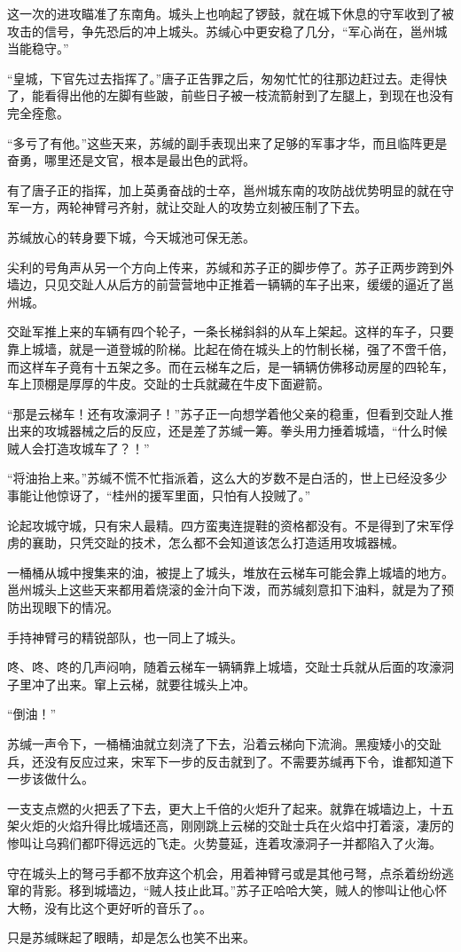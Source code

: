 这一次的进攻瞄准了东南角。城头上也响起了锣鼓，就在城下休息的守军收到了被攻击的信号，争先恐后的冲上城头。苏缄心中更安稳了几分，“军心尚在，邕州城当能稳守。”

“皇城，下官先过去指挥了。”唐子正告罪之后，匆匆忙忙的往那边赶过去。走得快了，能看得出他的左脚有些跛，前些日子被一枝流箭射到了左腿上，到现在也没有完全痊愈。

“多亏了有他。”这些天来，苏缄的副手表现出来了足够的军事才华，而且临阵更是奋勇，哪里还是文官，根本是最出色的武将。

有了唐子正的指挥，加上英勇奋战的士卒，邕州城东南的攻防战优势明显的就在守军一方，两轮神臂弓齐射，就让交趾人的攻势立刻被压制了下去。

苏缄放心的转身要下城，今天城池可保无恙。

尖利的号角声从另一个方向上传来，苏缄和苏子正的脚步停了。苏子正两步跨到外墙边，只见交趾人从后方的前营营地中正推着一辆辆的车子出来，缓缓的逼近了邕州城。

交趾军推上来的车辆有四个轮子，一条长梯斜斜的从车上架起。这样的车子，只要靠上城墙，就是一道登城的阶梯。比起在倚在城头上的竹制长梯，强了不啻千倍，而这样车子竟有十五架之多。而在云梯车之后，是一辆辆仿佛移动房屋的四轮车，车上顶棚是厚厚的牛皮。交趾的士兵就藏在牛皮下面避箭。

“那是云梯车！还有攻濠洞子！”苏子正一向想学着他父亲的稳重，但看到交趾人推出来的攻城器械之后的反应，还是差了苏缄一筹。拳头用力捶着城墙，“什么时候贼人会打造攻城车了？！”

“将油抬上来。”苏缄不慌不忙指派着，这么大的岁数不是白活的，世上已经没多少事能让他惊讶了，“桂州的援军里面，只怕有人投贼了。”

论起攻城守城，只有宋人最精。四方蛮夷连提鞋的资格都没有。不是得到了宋军俘虏的襄助，只凭交趾的技术，怎么都不会知道该怎么打造适用攻城器械。

一桶桶从城中搜集来的油，被提上了城头，堆放在云梯车可能会靠上城墙的地方。邕州城头上这些天来都用着烧滚的金汁向下泼，而苏缄刻意扣下油料，就是为了预防出现眼下的情况。

手持神臂弓的精锐部队，也一同上了城头。

咚、咚、咚的几声闷响，随着云梯车一辆辆靠上城墙，交趾士兵就从后面的攻濠洞子里冲了出来。窜上云梯，就要往城头上冲。

“倒油！”

苏缄一声令下，一桶桶油就立刻浇了下去，沿着云梯向下流淌。黑瘦矮小的交趾兵，还没有反应过来，宋军下一步的反击就到了。不需要苏缄再下令，谁都知道下一步该做什么。

一支支点燃的火把丢了下去，更大上千倍的火炬升了起来。就靠在城墙边上，十五架火炬的火焰升得比城墙还高，刚刚跳上云梯的交趾士兵在火焰中打着滚，凄厉的惨叫让乌鸦们都吓得远远的飞走。火势蔓延，连着攻濠洞子一并都陷入了火海。

守在城头上的弩弓手都不放弃这个机会，用着神臂弓或是其他弓弩，点杀着纷纷逃窜的背影。移到城墙边，“贼人技止此耳。”苏子正哈哈大笑，贼人的惨叫让他心怀大畅，没有比这个更好听的音乐了。。

只是苏缄眯起了眼睛，却是怎么也笑不出来。

